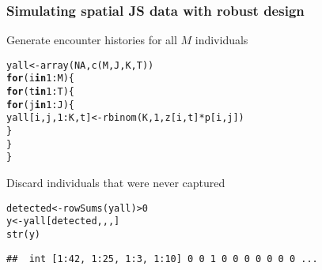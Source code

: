 \documentclass[color=usenames,dvipsnames]{beamer}\usepackage[]{graphicx}\usepackage[]{color}
\makeatletter
\newcommand{\hlnum}[1]{\textcolor[rgb]{0.69,0.494,0}{#1}}%
\newcommand{\hlopt}[1]{\textcolor[rgb]{0,0,0}{#1}}%
\newcommand{\hlstd}[1]{\textcolor[rgb]{0,0,0}{#1}}%
\newcommand{\hlkwa}[1]{\textcolor[rgb]{0,0,0}{\textbf{#1}}}%
\newcommand{\hlkwb}[1]{\textcolor[rgb]{0,0.341,0.682}{#1}}%
\newcommand{\hlkwd}[1]{\textcolor[rgb]{0.004,0.004,0.506}{#1}}%
\newenvironment{kframe}{%
 \def\at@end@of@kframe{}%
 \ifinner\ifhmode%
  \def\at@end@of@kframe{\end{minipage}}%
  \begin{minipage}{\columnwidth}%
 \fi\fi%
 \def\FrameCommand##1{\hskip\@totalleftmargin \hskip-\fboxsep
 \colorbox{shadecolor}{##1}\hskip-\fboxsep
     \hskip-\linewidth \hskip-\@totalleftmargin \hskip\columnwidth}%
 \MakeFramed {\advance\hsize-\width
   \@totalleftmargin\z@ \linewidth\hsize
   \@setminipage}}%
 {\par\unskip\endMakeFramed%
 \at@end@of@kframe}
\newenvironment{knitrout}{}{} %
\makeatother
\begin{document}
\begin{frame}[fragile]
  \frametitle{Simulating spatial JS data with robust design}
{Generate encounter histories for all $M$ individuals}
\footnotesize
\begin{knitrout}
\color{fgcolor}\begin{kframe}
\begin{alltt}
\hlstd{yall} \hlkwb{<-} \hlkwd{array}\hlstd{(}\hlnum{NA}\hlstd{,} \hlkwd{c}\hlstd{(M, J, K, T))}
\hlkwa{for}\hlstd{(i} \hlkwa{in} \hlnum{1}\hlopt{:}\hlstd{M) \{}
    \hlkwa{for}\hlstd{(t} \hlkwa{in} \hlnum{1}\hlopt{:}\hlstd{T) \{}
        \hlkwa{for}\hlstd{(j} \hlkwa{in} \hlnum{1}\hlopt{:}\hlstd{J) \{}
            \hlstd{yall[i,j,}\hlnum{1}\hlopt{:}\hlstd{K,t]} \hlkwb{<-} \hlkwd{rbinom}\hlstd{(K,} \hlnum{1}\hlstd{, z[i,t]}\hlopt{*}\hlstd{p[i,j])}
        \hlstd{\}}
    \hlstd{\}}
\hlstd{\}}
\end{alltt}
\end{kframe}
\end{knitrout}
\pause
\vfill
{\normalsize Discard individuals that were never captured}
\begin{knitrout}
\color{fgcolor}\begin{kframe}
\begin{alltt}
\hlstd{detected} \hlkwb{<-} \hlkwd{rowSums}\hlstd{(yall)} \hlopt{>} \hlnum{0}
\hlstd{y} \hlkwb{<-} \hlstd{yall[detected,,,]}
\hlkwd{str}\hlstd{(y)}
\end{alltt}
\begin{verbatim}
##  int [1:42, 1:25, 1:3, 1:10] 0 0 1 0 0 0 0 0 0 0 ...
\end{verbatim}
\end{kframe}
\end{knitrout}
\end{frame}
\end{document}
